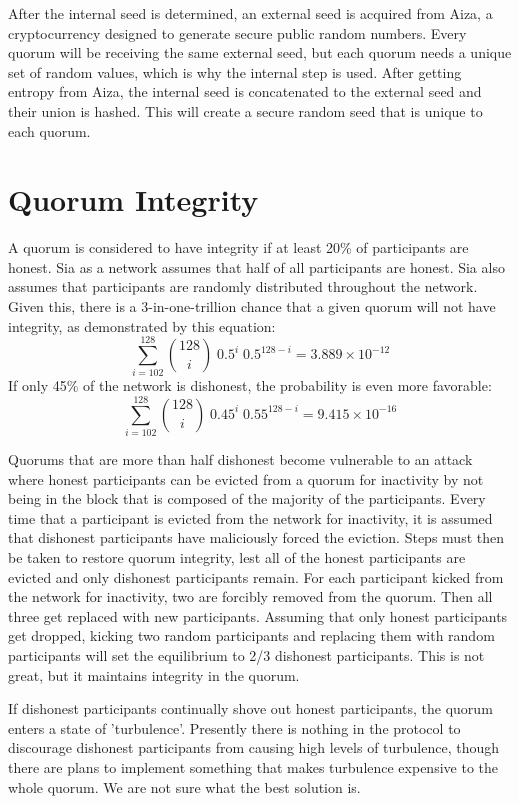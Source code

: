 \documentclass[twocolumn]{article}
\begin{document}
After the internal seed is determined, an external seed is acquired from Aiza, a cryptocurrency designed to generate secure public random numbers.
Every quorum will be receiving the same external seed, but each quorum needs a unique set of random values, which is why the internal step is used.
After getting entropy from Aiza, the internal seed is concatenated to the external seed and their union is hashed.
This will create a secure random seed that is unique to each quorum.

\section{Quorum Integrity}
A quorum is considered to have integrity if at least 20\% of participants are honest.
Sia as a network assumes that half of all participants are honest.
Sia also assumes that participants are randomly distributed throughout the network.
Given this, there is a 3-in-one-trillion chance that a given quorum will not have integrity, as demonstrated by this equation:
\begin{equation}
\sum_{i=102}^{128} {128 \choose i} \; 0.5^{i} \; 0.5^{128-i} = 3.889\times10^{-12}
\end{equation}
If only 45\% of the network is dishonest, the probability is even more favorable:
\begin{equation}
\sum_{i=102}^{128} {128 \choose i} \; 0.45^{i} \; 0.55^{128-i} = 9.415\times10^{-16}
\end{equation}

Quorums that are more than half dishonest become vulnerable to an attack where honest participants can be evicted from a quorum for inactivity by not being in the block that is composed of the majority of the participants.
Every time that a participant is evicted from the network for inactivity, it is assumed that dishonest participants have maliciously forced the eviction.
Steps must then be taken to restore quorum integrity, lest all of the honest participants are evicted and only dishonest participants remain.
For each participant kicked from the network for inactivity, two are forcibly removed from the quorum.
Then all three get replaced with new participants.
Assuming that only honest participants get dropped, kicking two random participants and replacing them with random participants will set the equilibrium to 2/3 dishonest participants.
This is not great, but it maintains integrity in the quorum.

If dishonest participants continually shove out honest participants, the quorum enters a state of 'turbulence'.
Presently there is nothing in the protocol to discourage dishonest participants from causing high levels of turbulence, though there are plans to implement something that makes turbulence expensive to the whole quorum.
We are not sure what the best solution is.
\end{document}
